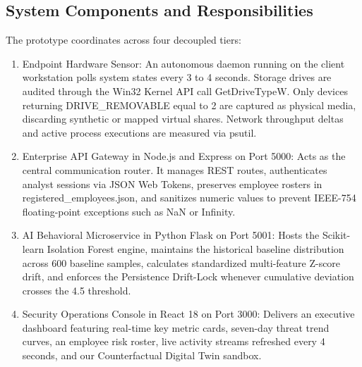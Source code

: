 \documentclass[conference]{IEEEtran}
\begin{document}
\subsection{System Components and Responsibilities}
The prototype coordinates across four decoupled tiers:
\begin{enumerate}
    \item Endpoint Hardware Sensor: An autonomous daemon running on the client workstation polls system states every 3 to 4 seconds. Storage drives are audited through the Win32 Kernel API call GetDriveTypeW. Only devices returning DRIVE\_REMOVABLE equal to 2 are captured as physical media, discarding synthetic or mapped virtual shares. Network throughput deltas and active process executions are measured via psutil.
    \item Enterprise API Gateway in Node.js and Express on Port 5000: Acts as the central communication router. It manages REST routes, authenticates analyst sessions via JSON Web Tokens, preserves employee rosters in registered\_employees.json, and sanitizes numeric values to prevent IEEE-754 floating-point exceptions such as NaN or Infinity.
    \item AI Behavioral Microservice in Python Flask on Port 5001: Hosts the Scikit-learn Isolation Forest engine, maintains the historical baseline distribution across 600 baseline samples, calculates standardized multi-feature Z-score drift, and enforces the Persistence Drift-Lock whenever cumulative deviation crosses the 4.5 threshold.
    \item Security Operations Console in React 18 on Port 3000: Delivers an executive dashboard featuring real-time key metric cards, seven-day threat trend curves, an employee risk roster, live activity streams refreshed every 4 seconds, and our Counterfactual Digital Twin sandbox.
\end{enumerate}

\begin{table}[htbp]
\caption{Main System Modules and Responsibilities}
\label{tab:modules}
\centering
{}
\end{table}
\end{document}
